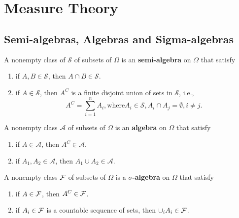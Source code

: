 \chapter{Measure Theory}

\section{Semi-algebras, Algebras and Sigma-algebras}

\begin{definition}
	A nonempty class of \(\mathcal{S}\) of subsets of \(\Omega\) is an \textbf{semi-algebra} on \(\Omega\) that satisfy
	\begin{enumerate}
		\item if \(A,B\in\mathcal{S}\), then \(A\cap B\in\mathcal{S}\).
		\item if \(A\in\mathcal{S}\), then \(A^C\) is a finite disjoint union of sets in \(\mathcal{S}\), i.e.,
		      \begin{equation*}
			      A^C=\sum_{i=1}^{n}A_i, \text{where} A_i\in\mathcal{S}, A_i\cap A_j=\emptyset ,i\neq j.
		      \end{equation*}
	\end{enumerate}
\end{definition}

\begin{definition}[Algebra]
	A nonempty class \(\mathcal{A}\) of subsets of \(\Omega\) is an \textbf{algebra} on \(\Omega\) that satisfy
	\begin{enumerate}
		\item if \(A\in\mathcal{A}\), then \(A^C\in\mathcal{A}\).
		\item if \(A_1, A_2\in\mathcal{A}\), then \(A_1\cup A_2\in\mathcal{A}\).
	\end{enumerate}
\end{definition}



\begin{definition}
	A nonempty class \(\mathcal{F}\) of subsets of \(\Omega\) is a \textbf{\(\sigma\)-algebra} on \(\Omega\) that satisfy
	\begin{enumerate}
		\item if \(A\in\mathcal{F}\), then \(A^C\in\mathcal{F}\).
		\item if \(A_i\in\mathcal{F}\) is a countable sequence of sets, then \(\cup_{i}A_{i}\in\mathcal{F}\).
	\end{enumerate}
\end{definition}

